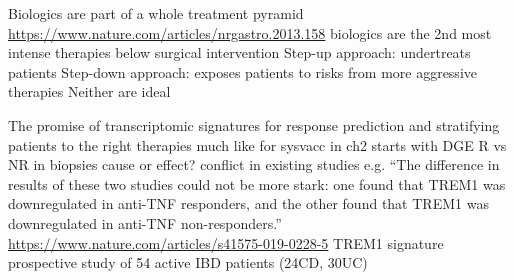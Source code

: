 \begin{outline}
\1 Biologics are part of a whole treatment pyramid \url{https://www.nature.com/articles/nrgastro.2013.158}
    \2 biologics are the 2nd most intense therapies below surgical intervention
    \2 Step-up approach: undertreats patients
    \2 Step-down approach: exposes patients to risks from more aggressive therapies
    \2 Neither are ideal

\1 The promise of transcriptomic signatures for response prediction and stratifying patients to the right therapies
    \2 much like for sysvacc in ch2
    \2 starts with DGE R vs NR in biopsies
    \2 cause or effect?
    \2 conflict in existing studies e.g. \enquote{The difference in results of these two studies could not be more stark: one found that TREM1 was downregulated in anti-TNF responders, and the other found that TREM1 was downregulated in anti-TNF non-responders.} \url{https://www.nature.com/articles/s41575-019-0228-5}
    \2 TREM1 signature \autocite{verstockt2019LowTREM1Expression}
        \2 prospective study of 54 active IBD patients (24CD, 30UC)


\end{outline}

